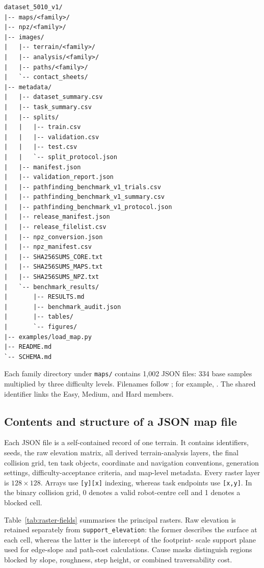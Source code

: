 \documentclass[11pt]{article}
\begin{document}
\begin{verbatim}
dataset_5010_v1/
|-- maps/<family>/
|-- npz/<family>/
|-- images/
|   |-- terrain/<family>/
|   |-- analysis/<family>/
|   |-- paths/<family>/
|   `-- contact_sheets/
|-- metadata/
|   |-- dataset_summary.csv
|   |-- task_summary.csv
|   |-- splits/
|   |   |-- train.csv
|   |   |-- validation.csv
|   |   |-- test.csv
|   |   `-- split_protocol.json
|   |-- manifest.json
|   |-- validation_report.json
|   |-- pathfinding_benchmark_v1_trials.csv
|   |-- pathfinding_benchmark_v1_summary.csv
|   |-- pathfinding_benchmark_v1_protocol.json
|   |-- release_manifest.json
|   |-- release_filelist.csv
|   |-- npz_conversion.json
|   |-- npz_manifest.csv
|   |-- SHA256SUMS_CORE.txt
|   |-- SHA256SUMS_MAPS.txt
|   |-- SHA256SUMS_NPZ.txt
|   `-- benchmark_results/
|       |-- RESULTS.md
|       |-- benchmark_audit.json
|       |-- tables/
|       `-- figures/
|-- examples/load_map.py
|-- README.md
`-- SCHEMA.md
\end{verbatim}

Each family directory under \texttt{maps/} contains 1,002 JSON files: 334 base
samples multiplied by three difficulty levels. Filenames follow
; for example,
. The shared identifier
 links the Easy, Medium, and Hard members.

\subsection{Contents and structure of a JSON map file}

Each JSON file is a self-contained record of one terrain. It contains
identifiers, seeds, the raw elevation matrix, all derived terrain-analysis
layers, the final collision grid, ten task objects, coordinate and navigation
conventions, generation settings, difficulty-acceptance criteria, and map-level
metadata. Every raster layer is $128\times128$. Arrays use \texttt{[y][x]}
indexing, whereas task endpoints use \texttt{[x,y]}. In the binary collision
grid, 0 denotes a valid robot-centre cell and 1 denotes a blocked cell.

Table~\ref{tab:raster-fields} summarises the principal rasters. Raw elevation
is retained separately from \texttt{support\_elevation}: the former describes
the surface at each cell, whereas the latter is the intercept of the footprint-
scale support plane used for edge-slope and path-cost calculations. Cause masks
distinguish regions blocked by slope, roughness, step height, or combined
traversability cost.
\end{document}
